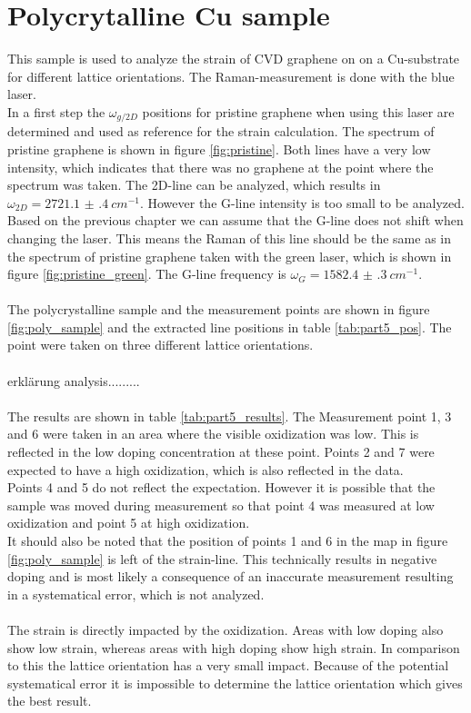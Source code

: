 \documentclass[12pt,a4paper]{article}
\begin{document}
\section{Polycrytalline Cu sample}
This sample is used to analyze the strain of CVD graphene on on a Cu-substrate for different lattice orientations. The Raman-measurement is done with the blue laser.\\ In a first step the $\omega_{g/2D}$ positions for pristine graphene when using this laser are determined and used as reference for the strain calculation. The spectrum of pristine graphene is shown in figure \ref{fig:pristine}. Both lines have a very low intensity, which indicates that there was no graphene at the point where the spectrum was taken. The 2D-line can be analyzed, which results in  $\omega_{2D} = \SI{2721.1(4)}{cm^{-1}}$. However the G-line intensity is too small to be analyzed. Based on the previous chapter we can assume that the G-line does not shift when changing the laser. This means the Raman of this line should be the same as in the spectrum of pristine graphene taken with the green laser, which is shown in figure \ref{fig:pristine_green}. The G-line frequency is $\omega_{G} = \SI{1582.4(3)}{cm^{-1}}$.\\
\\
The polycrystalline sample and the measurement points are shown in figure  \ref{fig:poly_sample} and the extracted line positions in table \ref{tab:part5_pos}. The point were taken on three different lattice orientations. \\
\\
erklärung analysis.........
\\
\\
The results are shown in table \ref{tab:part5_results}. The Measurement point 1, 3 and 6 were taken in an area where the visible oxidization was low. This is reflected in the low doping concentration at these point. Points 2 and 7 were expected to have a high oxidization, which is also reflected in the data.\\
Points 4 and 5 do not reflect the expectation. However it is possible that the sample was moved during measurement so that point 4 was measured at low oxidization and point 5 at high oxidization.\\
It should also be noted that the position of points 1 and 6 in the map in figure \ref{fig:poly_sample} is left of the strain-line. This technically results in negative doping and is most likely a consequence of an inaccurate measurement resulting in a systematical error, which is not analyzed.\\
\\
The strain is directly impacted by the oxidization. Areas with low doping also show low strain, whereas areas with high doping show high strain. In comparison to this the lattice orientation has a very small impact. Because of the potential systematical error it is impossible to determine the lattice orientation which gives the best result.
\end{document}

